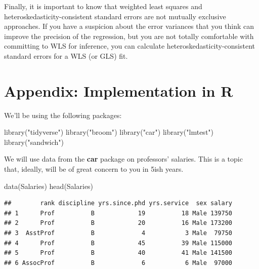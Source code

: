 \documentclass[
  12pt,
  oneside,openany]{book}
\newenvironment{Shaded}{\begin{snugshade}}{\end{snugshade}}
\newcommand{\FunctionTok}[1]{\textcolor[rgb]{0.00,0.00,0.00}{#1}}
\newcommand{\NormalTok}[1]{#1}
\newcommand{\StringTok}[1]{\textcolor[rgb]{0.31,0.60,0.02}{#1}}
\begin{document}
Finally, it is important to know that weighted least squares and heteroskedasticity-consistent standard errors are not mutually exclusive approaches. If you have a suspicion about the error variances that you think can improve the precision of the regression, but you are not totally comfortable with committing to WLS for inference, you can calculate heteroskedasticity-consistent standard errors for a WLS (or GLS) fit.

\hypertarget{appendix-implementation-in-r}{%
\section{Appendix: Implementation in R}\label{appendix-implementation-in-r}}

We'll be using the following packages:

\begin{Shaded}
\begin{Highlighting}[]
\FunctionTok{library}\NormalTok{(}\StringTok{"tidyverse"}\NormalTok{)}
\FunctionTok{library}\NormalTok{(}\StringTok{"broom"}\NormalTok{)}
\FunctionTok{library}\NormalTok{(}\StringTok{"car"}\NormalTok{)}
\FunctionTok{library}\NormalTok{(}\StringTok{"lmtest"}\NormalTok{)}
\FunctionTok{library}\NormalTok{(}\StringTok{"sandwich"}\NormalTok{)}
\end{Highlighting}
\end{Shaded}

We will use data from the \textbf{car} package on professors' salaries. This is a topic that, ideally, will be of great concern to you in 5ish years.

\begin{Shaded}
\begin{Highlighting}[]
\FunctionTok{data}\NormalTok{(Salaries)}
\FunctionTok{head}\NormalTok{(Salaries)}
\end{Highlighting}
\end{Shaded}

\begin{verbatim}
##        rank discipline yrs.since.phd yrs.service  sex salary
## 1      Prof          B            19          18 Male 139750
## 2      Prof          B            20          16 Male 173200
## 3  AsstProf          B             4           3 Male  79750
## 4      Prof          B            45          39 Male 115000
## 5      Prof          B            40          41 Male 141500
## 6 AssocProf          B             6           6 Male  97000
\end{verbatim}
\end{document}
